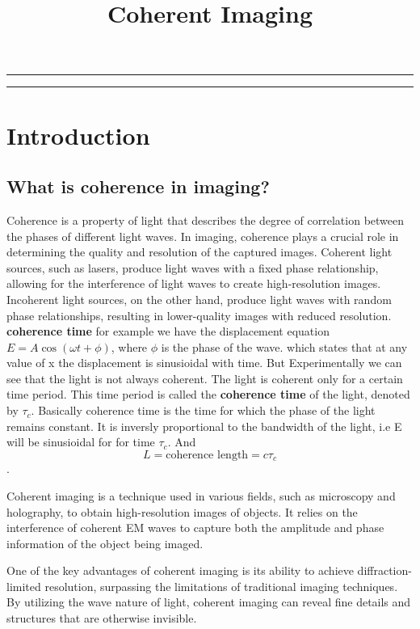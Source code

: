 \documentclass[12pt, a4paper, twocolumn]{article}
\title{\textbf{Coherent Imaging\\}} %
\author{} %
\date{} %
\begin{document}
\begin{titlepage}

	\maketitle %
	\vspace*{10cm}
	
\end{titlepage}
\thispagestyle{firstpage}
\hrule
\tableofcontents
\vspace*{20pt}
\hrule
\section{Introduction}
\subsection{What is coherence in imaging?}
Coherence is a property of light that describes the degree of correlation between the phases of different light waves. In imaging, coherence plays a crucial role in determining the quality and resolution of the captured images. Coherent light sources, such as lasers, produce light waves with a fixed phase relationship, allowing for the interference of light waves to create high-resolution images. Incoherent light sources, on the other hand, produce light waves with random phase relationships, resulting in lower-quality images with reduced resolution.
\textbf{coherence time}
for example we have the displacement equation $ E = A\cos(\omega t + \phi) $, where $\phi$ is the phase of the wave.  which states that at any value of x the displacement is sinusioidal with time. But Experimentally we can see that the light is not always coherent. The light is coherent only for a certain time period. This time period is called the \textbf{coherence time} of the light, denoted by $\tau_c$. Basically coherence time is the time for which the phase of the light remains constant. It is inversly proportional to the bandwidth of the light, i.e E will be sinusioidal for for time $\tau_c$. And $$L = \text{coherence length} = c\tau_c$$.
\par
Coherent imaging is a technique used in various fields, such as microscopy and holography, to obtain high-resolution images of objects. It relies on the interference of coherent EM waves to capture both the amplitude and phase information of the object being imaged.

One of the key advantages of coherent imaging is its ability to achieve diffraction-limited resolution, surpassing the limitations of traditional imaging techniques. By utilizing the wave nature of light, coherent imaging can reveal fine details and structures that are otherwise invisible.
\end{document}
